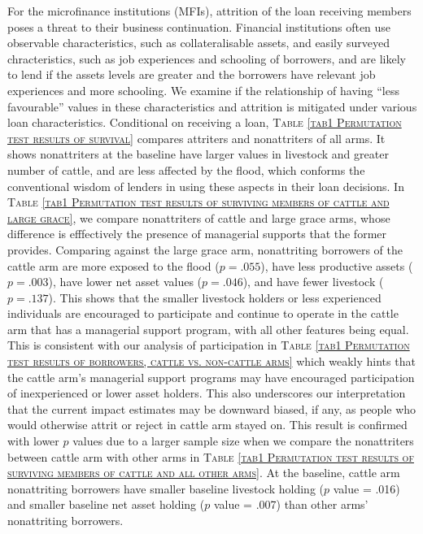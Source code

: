 	For the microfinance institutions (MFIs), attrition of the loan receiving members poses a threat to their business continuation. Financial institutions often use observable characteristics, such as collateralisable assets, and easily surveyed chracteristics, such as job experiences and schooling of borrowers, and are likely to lend if the assets levels are greater and the borrowers have relevant job experiences and more schooling. We examine if the relationship of having ``less favourable'' values in these characteristics and attrition is mitigated under various loan characteristics. Conditional on receiving a loan, \textsc{\normalsize Table \ref{tab1 Permutation test results of survival}} compares attriters and nonattriters of all arms. It shows nonattriters at the baseline have larger values in livestock and greater number of cattle, and are less affected by the flood, which conforms the conventional wisdom of lenders in using these aspects in their loan decisions. In \textsc{\normalsize Table \ref{tab1 Permutation test results of surviving members of cattle and large grace}}, we compare nonattriters of \textsf{cattle} and \textsf{large grace} arms, whose difference is efffectively the presence of managerial supports that the former provides. \label{PageOfAttrition}%
	Comparing against the \textsf{large grace} arm, nonattriting borrowers of the \textsf{cattle} arm are more exposed to the flood ($p=.055$), have less productive assets ($p=.003$), have lower net asset values ($p=.046$), and have fewer livestock ($p=.137$). This shows that the smaller livestock holders or less experienced individuals are encouraged to participate and continue to operate in the \textsf{cattle} arm that has a managerial support program, with all other features being equal. This is consistent with our analysis of participation in \textsc{\normalsize Table \ref{tab1 Permutation test results of borrowers, cattle vs. non-cattle arms}} which weakly hints that the \textsf{cattle} arm's managerial support programs may have encouraged participation of inexperienced or lower asset holders. This also underscores our interpretation that the current impact estimates may be downward biased, if any, as people who would otherwise attrit or reject in cattle arm stayed on. This result is confirmed with lower $p$ values due to a larger sample size when we compare the nonattriters between \textsf{cattle} arm with other arms in \textsc{\normalsize Table \ref{tab1 Permutation test results of surviving members of cattle and all other arms}}. At the baseline, \textsf{cattle} arm nonattriting borrowers have smaller baseline livestock holding ($p$ value = .016) and smaller baseline net asset holding ($p$ value = .007) than other arms' nonattriting borrowers. 

